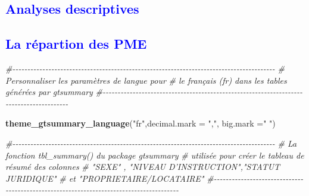 \documentclass[
]{article}
\newenvironment{Shaded}{\begin{snugshade}}{\end{snugshade}}
\newcommand{\AttributeTok}[1]{\textcolor[rgb]{0.13,0.29,0.53}{#1}}
\newcommand{\CommentTok}[1]{\textcolor[rgb]{0.56,0.35,0.01}{\textit{#1}}}
\newcommand{\FunctionTok}[1]{\textcolor[rgb]{0.13,0.29,0.53}{\textbf{#1}}}
\newcommand{\NormalTok}[1]{#1}
\newcommand{\StringTok}[1]{\textcolor[rgb]{0.31,0.60,0.02}{#1}}
\begin{document}
\newpage

\textcolor{blue}{\subsection{Analyses descriptives}}

\textcolor{blue}{\subsection{La répartion des PME}}

\begin{Shaded}
\begin{Highlighting}[]
\CommentTok{\#{-}{-}{-}{-}{-}{-}{-}{-}{-}{-}{-}{-}{-}{-}{-}{-}{-}{-}{-}{-}{-}{-}{-}{-}{-}{-}{-}{-}{-}{-}{-}{-}{-}{-}{-}{-}{-}{-}{-}{-}{-}{-}{-}{-}{-}{-}{-}{-}{-}{-}{-}{-}{-}{-}{-}{-}{-}{-}{-}{-}{-}{-}{-}{-}{-}{-}{-}{-}{-}{-}{-}{-}{-}{-}{-}{-}{-}{-}{-}{-}{-}{-}{-}{-}{-}{-}{-}{-}}
\CommentTok{\#         Personnaliser les paramètres de langue pour}
\CommentTok{\#   le français (fr) dans les tables générées par gtsummary}
\CommentTok{\#{-}{-}{-}{-}{-}{-}{-}{-}{-}{-}{-}{-}{-}{-}{-}{-}{-}{-}{-}{-}{-}{-}{-}{-}{-}{-}{-}{-}{-}{-}{-}{-}{-}{-}{-}{-}{-}{-}{-}{-}{-}{-}{-}{-}{-}{-}{-}{-}{-}{-}{-}{-}{-}{-}{-}{-}{-}{-}{-}{-}{-}{-}{-}{-}{-}{-}{-}{-}{-}{-}{-}{-}{-}{-}{-}{-}{-}{-}{-}{-}{-}{-}{-}{-}{-}{-}{-}{-}}



\FunctionTok{theme\_gtsummary\_language}\NormalTok{(}\StringTok{"fr"}\NormalTok{,}\AttributeTok{decimal.mark =} \StringTok{","}\NormalTok{, }\AttributeTok{big.mark =}\StringTok{" "}\NormalTok{)}




\CommentTok{\#{-}{-}{-}{-}{-}{-}{-}{-}{-}{-}{-}{-}{-}{-}{-}{-}{-}{-}{-}{-}{-}{-}{-}{-}{-}{-}{-}{-}{-}{-}{-}{-}{-}{-}{-}{-}{-}{-}{-}{-}{-}{-}{-}{-}{-}{-}{-}{-}{-}{-}{-}{-}{-}{-}{-}{-}{-}{-}{-}{-}{-}{-}{-}{-}{-}{-}{-}{-}{-}{-}{-}{-}{-}{-}{-}{-}{-}{-}{-}{-}{-}{-}{-}{-}{-}{-}{-}{-}}
\CommentTok{\#  La fonction tbl\_summary() du package gtsummary }
\CommentTok{\#   utilisée pour créer le tableau de résumé des colonnes}
\CommentTok{\#     "SEXE" , "NIVEAU D’INSTRUCTION","STATUT JURIDIQUE"}
\CommentTok{\#        et "PROPRIETAIRE/LOCATAIRE"}
\CommentTok{\#{-}{-}{-}{-}{-}{-}{-}{-}{-}{-}{-}{-}{-}{-}{-}{-}{-}{-}{-}{-}{-}{-}{-}{-}{-}{-}{-}{-}{-}{-}{-}{-}{-}{-}{-}{-}{-}{-}{-}{-}{-}{-}{-}{-}{-}{-}{-}{-}{-}{-}{-}{-}{-}{-}{-}{-}{-}{-}{-}{-}{-}{-}{-}{-}{-}{-}{-}{-}{-}{-}{-}{-}{-}{-}{-}{-}{-}{-}{-}{-}{-}{-}{-}{-}{-}{-}{-}{-}}





\end{Highlighting}
\end{Shaded}
\end{document}
